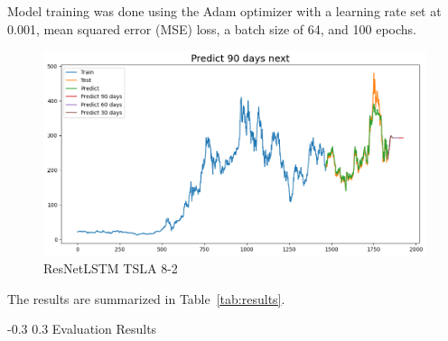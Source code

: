 \documentclass[twocolumn]{llncs}
\makeatletter
\renewcommand{\subsection}{\@startsection{subsection}{2}{\z@}%
  {-0.3\baselineskip}  %
  {0.3\baselineskip}   %
  {\normalfont\normalsize\bfseries}}
\makeatother
\begin{document}
\noindent Model training was done using the Adam optimizer with a learning rate set at 0.001, mean squared error (MSE) loss, a batch size of 64, and 100 epochs.

\begin{figure}[H]
    \centering
    \includegraphics[width=1\linewidth]{resnetlstm_predictions.png}
    \caption{ResNetLSTM TSLA 8-2 }
    \label{fig:boxplot}
\end{figure}

\noindent The results are summarized in Table~\ref{tab:results}.
\begin{table}[H]
\centering
\caption{Forecasting performance of ResNet and ResNetLSTM on the test set.}
\label{tab:results}
\end{table}

\subsection{Evaluation Results}
\vspace{-2em}

\begin{table}[H]
\centering
\caption{Comparison of forecasting performance across models}
\label{tab:model_comparison}
\end{table}
\end{document}
